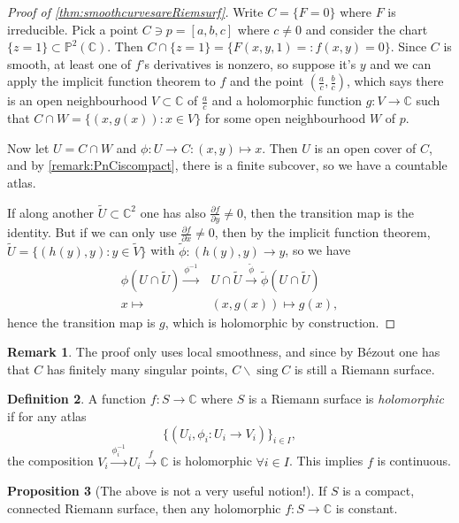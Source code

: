 \documentclass{article}
\newcommand{\C}{\mathbb{C}}
\newcommand{\p}{\mathbb{P}}
\newcommand{\sing}{\operatorname{sing}}
\theoremstyle{definition}
\newtheorem{defn}{Definition}[subsection]
\newtheorem{prop}[defn]{Proposition}
\newtheorem{remark}[defn]{Remark}
\begin{document}
\begin{proof}[Proof of \ref{thm:smoothcurvesareRiemsurf}]
Write $C=\{F=0\}$ where $F$ is irreducible. Pick a point $C\ni p=[a,b,c]$ where $c\neq 0$ and consider the chart $\{z=1\}\subset\p^2(\C)$. Then $C\cap \{z=1\}=\{F(x,y,1)=:f(x,y)=0\}$. Since $C$ is smooth, at least one of $f$'s derivatives is nonzero, so suppose it's $y$ and we can apply the implicit function theorem to $f$ and the point $\left(\frac{a}{c},\frac{b}{c}\right)$, which says there is an open neighbourhood $V\subset\C$ of $\frac{a}{c}$ and a holomorphic function $g:V\rightarrow\C$ such that $C\cap W=\{(x,g(x)):x\in V\}$ for some open neighbourhood $W$ of $p$.

Now let $U=C\cap W$ and $\phi:U\rightarrow C:(x,y)\mapsto x$. Then $U$ is an open cover of $C$, and by \ref{remark:PnCiscompact}, there is a finite subcover, so we have a countable atlas.

If along another $\widetilde U\subset\C^2$ one has also $\frac{\partial f}{\partial y}\neq 0$, then the transition map is the identity. But if we can only use $\frac{\partial f}{\partial x}\neq 0$, then by the implicit function theorem, $\widetilde U=\{(h(y),y):y\in\widetilde V\}$ with $\widetilde\phi:(h(y),y)\rightarrow y$, so we have
\[
\begin{aligned}
\phi(U\cap \widetilde U)\xrightarrow{\phi^{-1}}&U\cap\widetilde U\xrightarrow{\widetilde\phi}\widetilde\phi(U\cap\widetilde U) \\
x\mapsto & (x,g(x))\mapsto g(x),
\end{aligned}
\]
hence the transition map is $g$, which is holomorphic by construction.
\end{proof}

\begin{remark}
The proof only uses local smoothness, and since by Bézout one has that $C$ has finitely many singular points, $C\backslash\sing C$ is still a Riemann surface.
\end{remark}

\begin{defn}
A function $f:S\rightarrow\C$ where $S$ is a Riemann surface is \textit{holomorphic} if for any atlas
\[
\{(U_i,\phi_i:U_i\rightarrow V_i)\}_{i\in I},
\]
the composition $V_i\xrightarrow{\phi_i^{-1}}U_i\xrightarrow{f}\C$ is holomorphic $\forall i\in I$. This implies $f$ is continuous.
\end{defn}

\begin{prop}[The above is not a very useful notion!]
If $S$ is a compact, connected Riemann surface, then any holomorphic $f:S\rightarrow\C$ is constant.
\end{prop}
\end{document}
